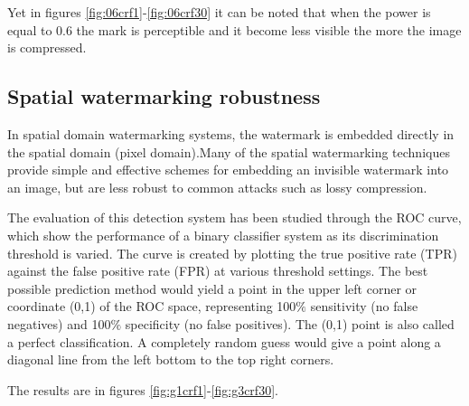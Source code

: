 Yet in figures \ref{fig:06crf1}-\ref{fig:06crf30} it can be noted that when the power is equal to 0.6 the mark is perceptible and it become less visible the more the image is compressed. 


\subsection{Spatial watermarking robustness}

In spatial domain watermarking systems, the watermark is embedded directly in the spatial domain (pixel domain).\newline  Many of the spatial watermarking techniques provide simple and effective schemes for embedding an invisible watermark into an image, but are less robust to common attacks such as lossy compression.

The evaluation of this detection system has been studied through the ROC curve, which show the performance of a binary classifier system as its discrimination threshold is varied. The curve is created by plotting the true positive rate (TPR) against the false positive rate (FPR) at various threshold settings. The best possible prediction method would yield a point in the upper left corner or coordinate (0,1) of the ROC space, representing 100$\%$ sensitivity (no false negatives) and 100$\%$ specificity (no false positives). The (0,1) point is also called a perfect classification. A completely random guess would give a point along a diagonal line from the left bottom to the top right corners.

The results are in figures \ref{fig:g1crf1}-\ref{fig:g3crf30}.

